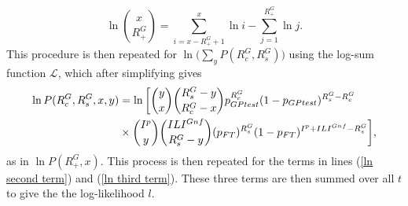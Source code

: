 \[\ln \binom{x}{R_{+}^G} = \sum_{i=x-R_{+}^G+1}^{x}\ln i - \sum_{j=1}^{R_{+}^G}\ln j .\]
This procedure is then repeated for $\ln \big(\sum_y P(R_c^G, R_s^G)\big)$ using the log-sum function $\mathcal{L}$, which after simplifying gives
\begin{align} \notag
\ln P(R_c^G, R_s^G, x, y) &= \ln \bigg[\binom{y}{x} \binom{R_{s}^G-y}{R_{c}^G-x} p_{GPtest}^{R_{c}^G}(1-p_{GPtest})^{R_{s}^G-R_{c}^G} \\ \notag
&\times \binom{I^p}{y} \binom{ILI^{Gnf}}{R_{s}^G-y} (p_{FT})^{R_{s}^G}(1-p_{FT})^{I^p+ILI^{Gnf}-R_{s}^G} \bigg],
\end{align}
as in $\ln P(R_+^G, x)$. This process is then repeated for the terms in lines (\ref{ln second term}) and (\ref{ln third term}). These three terms are then summed over all $t$ to give the the log-likelihood $l$.

